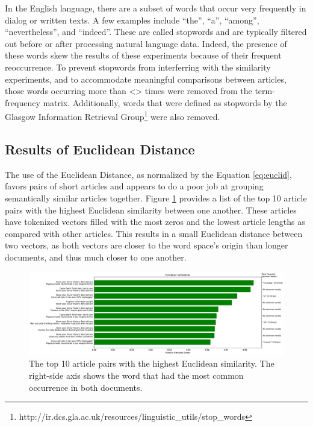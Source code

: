 \documentclass[11pt]{article}
\begin{document}
In the English language, there are a subset of words that occur very frequently in dialog or written texts.
A few examples include ``the'', ``a'', ``among'', ``nevertheless'', and ``indeed''.
These are called stopwords and are typically filtered out before or after processing natural language data.
Indeed, the presence of these words skew the results of these experiments because of their frequent reoccurrence.
To prevent stopwords from interferring with the similarity experiments, and to accommodate meaningful comparisons between articles, those words occurring more than <> times were removed from the term-frequency matrix.
Additionally, words that were defined as stopwords by the Glasgow Information
Retrieval Group\footnote{http://ir.dcs.gla.ac.uk/resources/linguistic\_utils/stop\_words} were also removed.

\subsection{Results of Euclidean Distance}

The use of the Euclidean Distance, as normalized by the Equation \ref{eq:euclid}, favors pairs of short articles and appears to do a poor job at grouping semantically similar articles together.
Figure \ref{fig:euclid} provides a list of the top 10 article pairs with the highest Euclidean similarity between one another.
These articles have tokenized vectors filled with the most zeros and the lowest article lengths as compared with other articles.
This results in a small Euclidean distance between two vectors, as both vectors are closer to the word space's origin than longer documents, and thus much closer to one another.

\begin{figure}[h] \label{fig:euclid}
  \centering
  \includegraphics[width=\textwidth]{figures/euclidean_most_sim}
  \caption{The top 10 article pairs with the highest Euclidean similarity.
  The right-side axis shows the word that had the most common occurrence in both documents.}
\end{figure}
\end{document}
